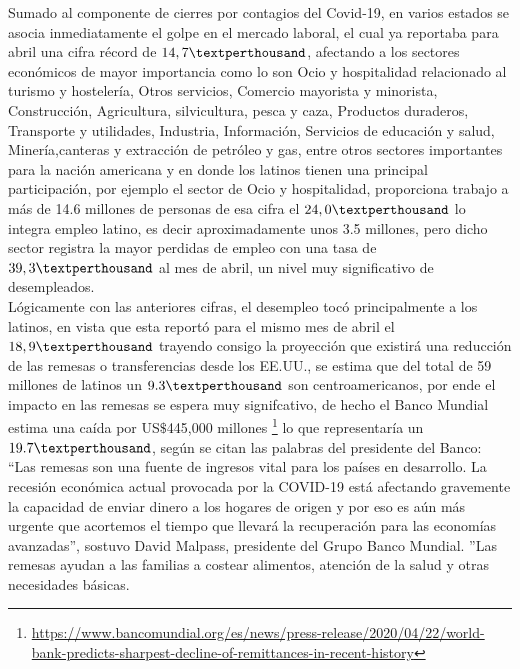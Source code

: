 Sumado al componente de cierres por contagios del Covid-19, en varios estados se asocia inmediatamente el golpe en el mercado laboral, el cual ya reportaba para abril una cifra récord de $14,7 \textperthousand$, afectando a los sectores económicos de mayor importancia como lo son Ocio y hospitalidad relacionado al turismo y hostelería, Otros servicios, Comercio mayorista y minorista, Construcción, Agricultura, silvicultura, pesca y caza, Productos duraderos, Transporte y utilidades, Industria, Información, Servicios de educación y salud, Minería,canteras y extracción de petróleo y gas, entre otros sectores importantes para la nación americana y en donde los latinos tienen una principal participación, por ejemplo el sector de Ocio y hospitalidad, proporciona trabajo a más de 14.6 millones de personas de esa cifra el $24,0 \textperthousand$ lo integra empleo latino, es decir aproximadamente unos 3.5 millones, pero dicho sector registra la mayor perdidas de empleo con una tasa de $39,3 \textperthousand$ al mes de abril, un nivel muy significativo de desempleados.\\

Lógicamente con las anteriores cifras, el desempleo tocó principalmente a los latinos, en vista que esta reportó para el mismo mes de abril el $18,9 \textperthousand$ trayendo consigo la proyección que existirá una reducción de las remesas o transferencias desde los EE.UU., se estima que del total de 59 millones de latinos un $9.3 \textperthousand$ son centroamericanos, por ende el impacto en las remesas se espera muy signifcativo, de hecho el Banco Mundial estima una caída por US$\$$445,000 millones \footnote{\href{https://www.bancomundial.org/es/news/press-release/2020/04/22/world-bank-predicts-sharpest-decline-of-remittances-in-recent-history}{https://www.bancomundial.org/es/news/press-release/2020/04/22/world-bank-predicts-sharpest-decline-of-remittances-in-recent-history}} lo que representaría un $19.7 \textperthousand$, según se citan las palabras del presidente del Banco: “Las remesas son una fuente de ingresos vital para los países en desarrollo. La recesión económica actual provocada por la COVID-19 está afectando gravemente la capacidad de enviar dinero a los hogares de origen y por eso es aún más urgente que acortemos el tiempo que llevará la recuperación para las economías avanzadas”, sostuvo David Malpass, presidente del Grupo Banco Mundial. ”Las remesas ayudan a las familias a costear alimentos, atención de la salud y otras necesidades básicas.\\

